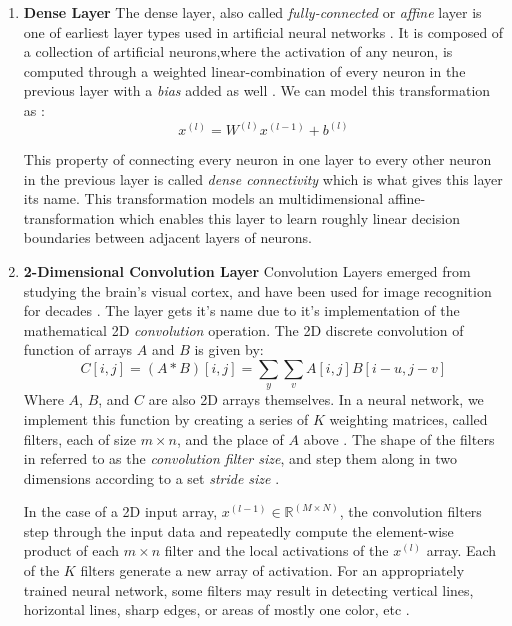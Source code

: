 \documentclass[conference,onecolumn,letterpaper]{IEEEtran}
\begin{document}
\begin{enumerate}

\item\textbf{Dense Layer}
The dense layer, also called \textit{fully-connected} or \textit{affine} layer is one of earliest layer types used in artificial neural networks \cite{Geron}. It is composed of a collection of artificial neurons,where the activation of any neuron, is computed through a weighted linear-combination of every neuron in the previous layer with a \textit{bias} added as well \cite{Geron,Goodfellow,Tensorflow}. We can model this transformation as :
\begin{equation}
\label{eqn:DenseCall}
x^{(l)} = W^{(l)}x^{(l-1)} + b^{(l)}
\end{equation}

This property of connecting every neuron in one layer to every other neuron in the previous layer is called \textit{dense connectivity} which is what gives this layer its name. This transformation models an multidimensional affine-transformation which enables this layer to learn roughly linear decision boundaries between adjacent layers of neurons. 

\item\textbf{2-Dimensional Convolution Layer}
Convolution Layers emerged from studying the brain's visual cortex, and have been used for image recognition for decades \cite{Geron,Goodfellow}. The layer gets it's name due to it's implementation of the mathematical 2D \textit{convolution} operation. The 2D discrete convolution of function of arrays $A$ and $B$ is given by:
\begin{equation}
\label{eqn:Conv2D}
C[i,j]  = (A * B)[i,j] = \sum_{y}\sum_{v} A[i,j]B[i-u,j-v]
\end{equation} 
Where $A$, $B$, and $C$ are also 2D arrays themselves. In a neural network, we implement this function by creating a series of $K$ weighting matrices, called filters, each of size $m \times n$, and the place of $A$ above \cite{Geron}. The shape of the filters in referred to as the \textit{convolution filter size}, and step them along in two dimensions according to a set \textit{stride size} \cite{Goodfellow}.

In the case of a 2D input array, $x^{(l-1)} \in \mathbb{R}^{(M \times N)}$, the convolution filters step through the input data and repeatedly compute the element-wise product of each $m \times n$ filter and the local activations of the $x^{(l)}$ array. Each of the $K$ filters generate a new array of activation. For an appropriately trained neural network, some filters may result in detecting vertical lines, horizontal lines, sharp edges, or areas of mostly one color, etc \cite{Geron}.


\end{enumerate}
\end{document}
